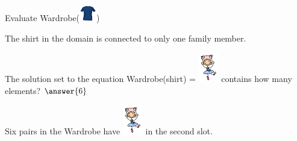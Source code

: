 \documentclass{ximera}
\begin{document}
\begin{exercise}
Evaluate Wardrobe({\includegraphics[width=28px,height=27px]{pics/elements/shirts/shirts7.png}})
  \begin{multipleChoice}
  \end{multipleChoice}
  \begin{feedback}
The shirt in the domain is connected to only one family member.
  \end{feedback}
\end{exercise}




\begin{exercise}
The solution set to the equation Wardrobe(shirt) = {\includegraphics[width=33px,height=49px]{pics/elements/family/family2.png}} contains how many elements? $\answer{6}$
  \begin{feedback}
Six pairs in the Wardrobe have {\includegraphics[width=33px,height=49px]{pics/elements/family/family2.png}} in the second slot.
  \end{feedback}
\end{exercise}
\end{document}

